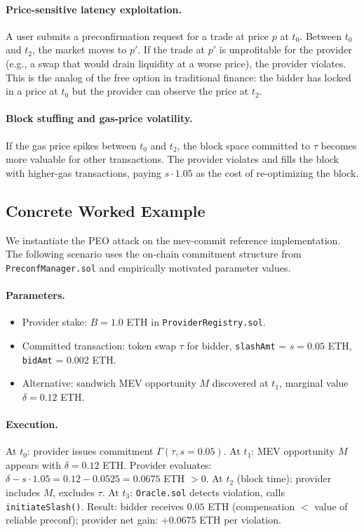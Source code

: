 \paragraph{Price-sensitive latency exploitation.}
A user submits a preconfirmation request for a trade at price $p$ at $t_0$.
Between $t_0$ and $t_2$, the market moves to $p'$. If the trade at $p'$
is unprofitable for the provider (e.g., a swap that would drain liquidity
at a worse price), the provider violates. This is the analog of the free
option in traditional finance: the bidder has locked in a price at $t_0$
but the provider can observe the price at $t_2$.

\paragraph{Block stuffing and gas-price volatility.}
If the gas price spikes between $t_0$ and $t_2$, the block space committed
to $\tau$ becomes more valuable for other transactions. The provider
violates and fills the block with higher-gas transactions, paying $s \cdot
1.05$ as the cost of re-optimizing the block.

\subsection{Concrete Worked Example}
\label{sec:peo-example}

We instantiate the PEO attack on the mev-commit reference implementation.
The following scenario uses the on-chain commitment structure from
\texttt{PreconfManager.sol} and empirically motivated parameter values.

\paragraph{Parameters.}
\begin{itemize}
  \item Provider stake: $B = 1.0$ ETH in \texttt{ProviderRegistry.sol}.
  \item Committed transaction: token swap $\tau$ for bidder,
    \texttt{slashAmt} = $s = 0.05$ ETH, \texttt{bidAmt} = $0.002$ ETH.
  \item Alternative: sandwich MEV opportunity $M$ discovered at $t_1$,
    marginal value $\delta = 0.12$ ETH.
\end{itemize}

\paragraph{Execution.}
At $t_0$: provider issues commitment $\Gamma(\tau, s = 0.05)$.
At $t_1$: MEV opportunity $M$ appears with $\delta = 0.12$ ETH.
Provider evaluates: $\delta - s \cdot 1.05 = 0.12 - 0.0525 = 0.0675$ ETH $> 0$.
At $t_2$ (block time): provider includes $M$, excludes $\tau$.
At $t_3$: \texttt{Oracle.sol} detects violation, calls \texttt{initiateSlash()}.
Result: bidder receives $0.05$ ETH (compensation $< $ value of reliable
preconf); provider net gain: $+0.0675$ ETH per violation.

